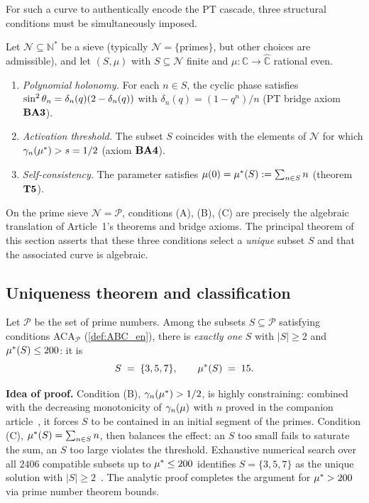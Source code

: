 For such a curve to authentically encode the PT cascade, three structural conditions must be simultaneously imposed.

\begin{definition}
\label{def:ABC_en}
Let $\mathcal N \subseteq \mathbb N^{*}$ be a sieve (typically $\mathcal N = \{$primes$\}$, but other choices are admissible), and let $(S, \mu)$ with $S \subseteq \mathcal N$ finite and $\mu : \mathbb C \to \widehat{\mathbb C}$ rational even.
\begin{enumerate}[nosep,label=\textbf{(\Alph*)}]
\item \emph{Polynomial holonomy.} For each $n \in S$, the cyclic phase satisfies $\sin^{2}\theta_{n} = \delta_n(q)(2 - \delta_n(q))$ with $\delta_n(q) = (1 - q^{n})/n$ (PT bridge axiom $\textbf{BA3}$).
\item \emph{Activation threshold.} The subset $S$ coincides with the elements of $\mathcal N$ for which $\gamma_{n}(\mu^{*}) > s = 1/2$ (axiom $\textbf{BA4}$).
\item \emph{Self-consistency.} The parameter satisfies $\mu(0) = \mu^{*}(S) := \sum_{n \in S} n$ (theorem~$\textbf{T5}$).
\end{enumerate}
\end{definition}

On the prime sieve $\mathcal N = \mathcal P$, conditions (A), (B), (C) are precisely the algebraic translation of Article~1's theorems and bridge axioms. The principal theorem of this section asserts that these three conditions select a \emph{unique} subset $S$ and that the associated curve is algebraic.

\subsection{Uniqueness theorem and classification}
\label{sec:courbe:classification}

\begin{theoreme}
\label{thm:courbe_classification_en}
Let $\mathcal P$ be the set of prime numbers. Among the subsets $S \subseteq \mathcal P$ satisfying conditions ACA$_{\mathcal P}$ (\ref{def:ABC_en}), there is \emph{exactly one} $S$ with $|S| \geq 2$ and $\mu^{*}(S) \leq 200$: it is
\[
S \;=\; \{3, 5, 7\}, \qquad \mu^{*}(S) \;=\; 15.
\]
\end{theoreme}

\textbf{Idea of proof.} Condition (B), $\gamma_{n}(\mu^{*}) > 1/2$, is highly constraining: combined with the decreasing monotonicity of $\gamma_{n}(\mu)$ with $n$ proved in the companion article~\cite{companion_M2}, it forces $S$ to be contained in an initial segment of the primes. Condition (C), $\mu^{*}(S) = \sum_{n \in S} n$, then balances the effect: an $S$ too small fails to saturate the sum, an $S$ too large violates the threshold. Exhaustive numerical search over all $2406$ compatible subsets up to $\mu^{*} \leq 200$ identifies $S = \{3, 5, 7\}$ as the unique solution with $|S| \geq 2$~\cite[\S 5]{PT_GeoFlow_PersistenceCurve}. The analytic proof completes the argument for $\mu^{*} > 200$ via prime number theorem bounds.

